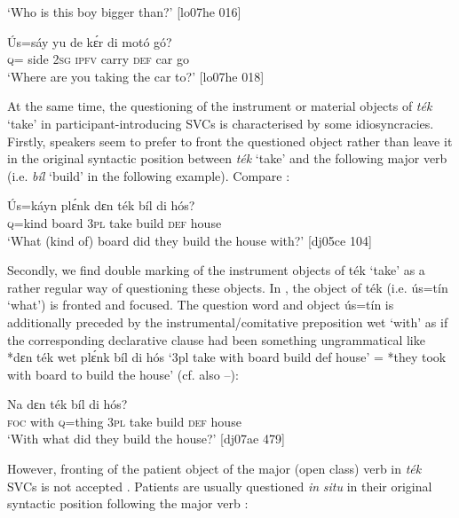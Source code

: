 \glt ‘Who is this boy bigger than?’ [lo07he 016]
\z


\ea%
    \label{ex:key:609}
    \gll \'{U}s=sáy  yu  de  kɛ́r    di  motó  gó?\\
{\textsc{q}=  side}  \textsc{2sg}  \textsc{ipfv}  carry  \textsc{def}  car    go\\

\glt ‘Where are you taking the car to?’ [lo07he 018]
\z

At the same time, the questioning of the instrument or material objects of \textit{ték} ‘take’ in participant-introducing SVCs is characterised by some idiosyncracies. Firstly, speakers seem to prefer to front the questioned object rather than leave it in the original syntactic position between \textit{ték} ‘take’ and the following major verb (i.e. \textit{bíl} ‘build’ in the following example). Compare :


\ea%
    \label{ex:key:610}
    \gll \'{U}s=káyn  plɛ́nk  dɛn  ték    bíl    di  hós?\\
\textsc{q}=kind  board  \textsc{3pl}  take    build  \textsc{def}  house\\

\glt ‘What (kind of) board did they build the house with?’ [dj05ce 104]
\z

Secondly, we find double marking of the instrument objects of ték ‘take’ as a rather regular way of questioning these objects. In , the object of ték (i.e. ús=tín ‘what’) is fronted and focused. The question word and object ús=tín is additionally preceded by the instrumental/comitative preposition wet ‘with’ as if the corresponding declarative clause had been something ungrammatical like *dɛn ték wet plɛ́nk bíl di hós ‘3pl take with board build def house’ = *they took with board to build the house’ (cf. also –): 


\ea%
    \label{ex:key:611}
    \gll Na        dɛn  ték  bíl    di  hós?\\
\textsc{foc}  with    \textsc{q}=thing  \textsc{3pl}  take  build  \textsc{def}  house\\

\glt ‘With what did they build the house?’ [dj07ae 479]
\z

However, fronting of the patient object of the major (open class) verb in \textit{ték} SVCs is not accepted . Patients are usually questioned \textit{in} \textit{situ} in their original syntactic position following the major verb :


